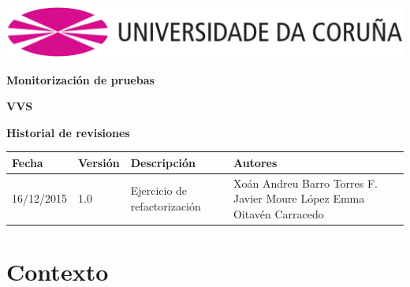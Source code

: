 \documentclass[12pt, a4paper, titlepage]{article}
\begin{document}

\begin{titlepage}

\includegraphics[width=15cm]{Imagenes/Simbolo_logo_UDC.png}

\vspace{6cm}

\begin{flushright}

	\LARGE{\textbf{Monitorización de pruebas}}
	
	\large{\textbf{VVS}}
\end{flushright}

\vspace{3cm}
\begin{center}
	\large{\textbf{Historial de revisiones}}
	
    \begin{tabular}{ | p{3cm} | p{2cm} | p{4cm} | p{6cm} |}
    \hline
    \textbf{Fecha} & \textbf{Versión} & \textbf{Descripción} & \textbf{Autores} \\ \hline
     16/12/2015 &  1.0 &  Ejercicio de refactorización & Xoán Andreu Barro Torres \newline F. Javier Moure López \newline Emma Oitavén Carracedo \\ \hline
    \end{tabular}
\end{center}

\end{titlepage}
\clearpage


\tableofcontents
\newpage

\section{Contexto}
\end{document}
